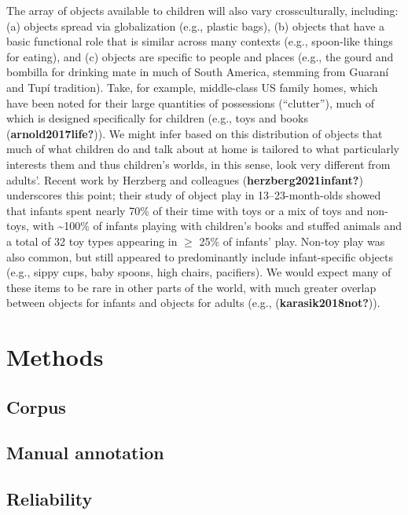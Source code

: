 \documentclass[10pt, letterpaper]{article}
\begin{document}
The array of objects available to children will also vary
crossculturally, including: (a) objects spread via globalization (e.g.,
plastic bags), (b) objects that have a basic functional role that is
similar across many contexts (e.g., spoon-like things for eating), and
(c) objects are specific to people and places (e.g., the gourd and
bombilla for drinking mate in much of South America, stemming from
Guaraní and Tupí tradition). Take, for example, middle-class US family
homes, which have been noted for their large quantities of possessions
(``clutter''), much of which is designed specifically for children
(e.g., toys and books (\textbf{arnold2017life?})). We might infer based
on this distribution of objects that much of what children do and talk
about at home is tailored to what particularly interests them and thus
children's worlds, in this sense, look very different from adults'.
Recent work by Herzberg and colleagues (\textbf{herzberg2021infant?})
underscores this point; their study of object play in 13--23-month-olds
showed that infants spent nearly 70\% of their time with toys or a mix
of toys and non-toys, with \textasciitilde100\% of infants playing with
children's books and stuffed animals and a total of 32 toy types
appearing in \(\ge\) 25\% of infants' play. Non-toy play was also
common, but still appeared to predominantly include infant-specific
objects (e.g., sippy cups, baby spoons, high chairs, pacifiers). We
would expect many of these items to be rare in other parts of the world,
with much greater overlap between objects for infants and objects for
adults (e.g., (\textbf{karasik2018not?})).

\hypertarget{methods}{%
\section{Methods}\label{methods}}

\hypertarget{corpus}{%
\subsection{Corpus}\label{corpus}}

\hypertarget{manual-annotation}{%
\subsection{Manual annotation}\label{manual-annotation}}

\hypertarget{reliability}{%
\subsection{Reliability}\label{reliability}}
\end{document}

